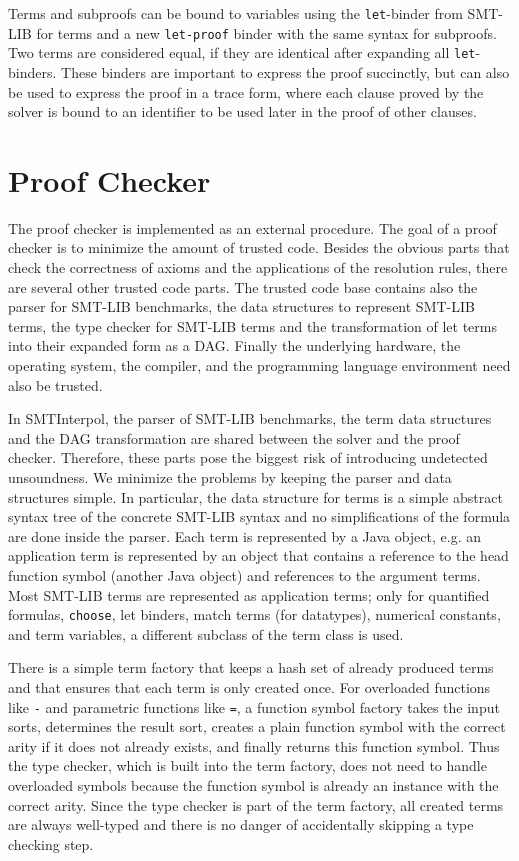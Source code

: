 \documentclass[a4paper]{easychair}
\newcommand\SI{SMTInterpol\xspace}
\newcommand\smtlib[1]{\texttt{#1}}
\begin{document}
Terms and subproofs can be bound to variables using the \smtlib{let}-binder from SMT-LIB for terms and a new \smtlib{let-proof} binder with the same syntax for subproofs.
Two terms are considered equal, if they are identical after expanding all \smtlib{let}-binders.
These binders are important to express the proof succinctly, but can also be used to express the proof in a trace form, where each clause proved by the solver is bound to an identifier to be used later in the proof of other clauses.

\section*{Proof Checker}

The proof checker is implemented as an external procedure.
The goal of a proof checker is to minimize the amount of trusted code.
Besides the obvious parts that check the correctness of axioms and the applications of the resolution rules, there are several other trusted code parts.
The trusted code base contains also the parser for SMT-LIB benchmarks,
the data structures to represent SMT-LIB terms,
the type checker for SMT-LIB terms and the transformation of let terms into their expanded form as a DAG.
Finally the underlying hardware, the operating system, the compiler, and the programming language environment need also be trusted.

In \SI, the parser of SMT-LIB benchmarks, the term data structures and the DAG transformation are shared between the solver and the proof checker.
Therefore, these parts pose the biggest risk of introducing undetected unsoundness.
We minimize the problems by keeping the parser and data structures simple.
In particular, the data structure for terms is a simple abstract syntax tree of the concrete SMT-LIB syntax and no simplifications of the formula are done inside the parser.
Each term is represented by a Java object, e.g. an application term is represented by an object that contains a reference to the head function symbol (another Java object) and references to the argument terms.
Most SMT-LIB terms are represented as application terms; only for quantified formulas, \smtlib{choose}, let binders, match terms (for datatypes), numerical constants, and term variables, a different subclass of the term class is used.

There is a simple term factory that keeps a hash set of already produced terms and that ensures that each term is only created once.
For overloaded functions like \smtlib{-} and parametric functions like \smtlib{=}, a function symbol factory takes the input sorts, determines the result sort, creates a plain function symbol with the correct arity if it does not already exists, and finally returns this function symbol.
Thus the type checker, which is built into the term factory, does not need to handle overloaded symbols because the function symbol is already an instance with the correct arity.
Since the type checker is part of the term factory, all created terms are always well-typed and there is no danger of accidentally skipping a type checking step.
\end{document}
